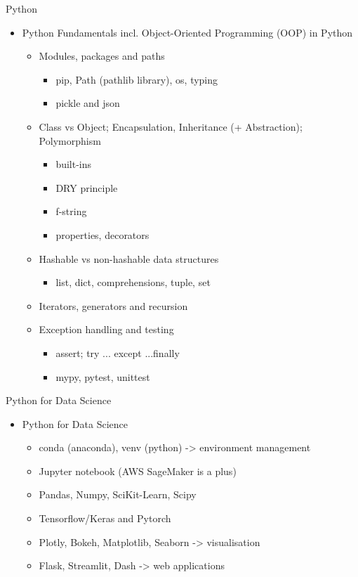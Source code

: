 \documentclass[compress,brown]{beamer}
\begin{document}
\begin{frame}{Python}
\begin{itemize}
  \item Python Fundamentals incl. Object-Oriented Programming (OOP) in Python
	\begin{itemize}
		\item Modules, packages and paths
		\begin{itemize}
			\item pip, Path (pathlib library), os, typing
			\item pickle and json
		\end{itemize} 		
		\item Class vs Object; Encapsulation, Inheritance (+ Abstraction); Polymorphism
		\begin{itemize}
			\item built-ins
			\item DRY principle
			\item f-string
			\item properties, decorators
		\end{itemize} 
		\item Hashable vs non-hashable data structures
			\begin{itemize}
				\item list, dict, comprehensions, tuple, set 
			\end{itemize}
		\item Iterators, generators and recursion
		\item Exception handling and testing
		\begin{itemize}
			\item assert; try ... except ...finally
			\item mypy, pytest, unittest
		\end{itemize}		
	\end{itemize}
\end{itemize}
\end{frame}

\begin{frame}{Python for Data Science}
\begin{itemize}
  \item Python for Data Science
\begin{itemize}
		\item conda (anaconda), venv (python) -> environment management
		\item Jupyter notebook (AWS SageMaker is a plus)
		\item Pandas, Numpy, SciKit-Learn, Scipy
		\item Tensorflow/Keras and Pytorch 
		\item Plotly, Bokeh, Matplotlib, Seaborn -> visualisation
		\item Flask, Streamlit, Dash -> web applications
\end{itemize}
\end{itemize}
\end{frame}
	
\end{document}
